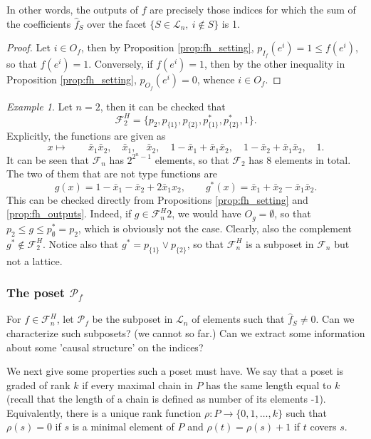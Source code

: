 \documentclass[12pt]{article}
\theoremstyle{definition}
\theoremstyle{remark}
\newtheorem{example}{Example}
\def\Fe{\mathcal F}
\begin{document}
In other words, the outputs of $f$ are precisely those indices for which the sum of the
coefficients $\hat f_S$ over the facet $\{S\in \mathcal L_n,\ i\notin S\}$ is 1.


\begin{proof} Let $i\in O_f$, then by Proposition \ref{prop:fh_setting}, $p_{I_f}(e^i)=1\le
f(e^i)$, so that $f(e^i)=1$. Conversely, if $f(e^i)=1$, then by the other inequality in
Proposition \ref{prop:fh_setting}, $p_{O_f}(e^i)=0$, whence $i\in O_f$.


\end{proof}


\begin{example}\label{ex:chain12} Let $n=2$, then it can be checked that 
\[
\Fe^H_2=\{p_2, p_{\{1\}}, p_{\{2\}}, p_{\{1\}}^*, p_{\{2\}}^*,1\}.
\]
Explicitly, the functions are given as
\[
x\mapsto   \qquad \bar x_1\bar x_2,\quad \bar x_1,\quad \bar x_2, \quad 1-\bar x_1+\bar
x_1\bar x_2,\quad 1-\bar x_2+\bar x_1\bar x_2,\quad 1.
\]
It can be seen that $\Fe_n$ has $2^{2^n-1}$ elements, so that $\Fe_2$ has 8
elements in total. The two of them that are not type functions are 
\[
g(x)=1-\bar x_1-\bar x_2+2\bar x_1x_2,\qquad g^*(x)=\bar x_1+\bar x_2-\bar x_1\bar x_2.
\]
This can be checked directly from Propositions \ref{prop:fh_setting} and
\ref{prop:fh_outputs}. Indeed, if $g\in \Fe^H_n2$, we would have $O_g=\emptyset$, so that 
$p_2\le g\le p_\emptyset^*=p_2$, which is obviously not the case. Clearly, also the
complement $g^*\notin \Fe_2^H$. Notice also that $g^*=p_{\{1\}}\vee p_{\{2\}}$, so that
$\Fe_n^H$ is a subposet in $\Fe_n$ but not a lattice.


\end{example}


\subsubsection{The poset $\mathcal P_f$}


For $f\in \Fe_n^H$, let $\mathcal P_f$ be the subposet in $\mathcal L_n$ of elements such that
$\hat f_S\ne 0$. Can we characterize such subposets? (we cannot so far.) Can we extract
some information about some 'causal structure' on the indices? 

We next give some properties such a poset must have. We say that a poset is graded of rank
$k$ if every maximal chain in $P$ has the same length equal to $k$ (recall that the length
of a chain is defined as number of its elements -1). Equivalently,  there is
a unique rank function $\rho: P\to \{0,1,\dots,k\}$ such that $\rho(s)=0$ if $s$ is a
minimal element of $P$ and $\rho(t)=\rho(s)+1$ if $t$ covers $s$. 
\end{document}
